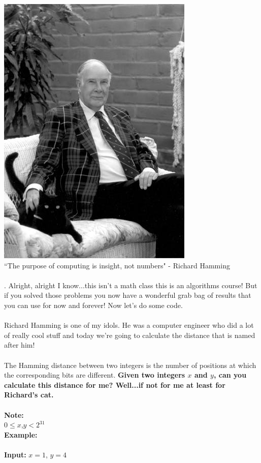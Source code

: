 \documentclass[12pt]{article}
\begin{document}
\newpage
\noindent \includegraphics[scale = 0.2]{hamming_cat.jpg}\\
``The purpose of computing is insight, not numbers" - Richard Hamming\\\\
. Alright, alright I know...this isn't a math class this is an algorithms course! But if you solved those problems you now have a wonderful grab bag of results that you can use for now and forever! Now let's do some code.\\\\
Richard Hamming is one of my idols. He was a computer engineer who did a lot of really cool stuff and today we're going to calculate the distance that is named after him!\\\\
The Hamming distance between two integers is the number of positions at which the corresponding bits are different. \textbf{Given two integers $x$ and $y$, can you calculate this distance for me? Well...if not for me at least for Richard's cat.}\\\\
\textbf{Note:}\\
$0 \leq x$,$y < 2^{31}$\\
\textbf{Example:}\\\\
\textbf{Input:} $x = 1$, $y = 4$\\\\
\end{document}
